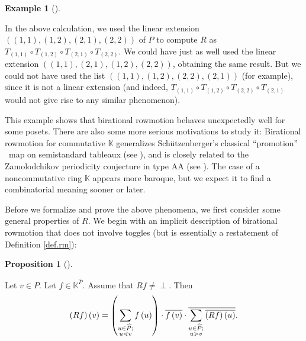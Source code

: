 \documentclass[numbers=enddot,12pt,final,onecolumn,notitlepage]{scrartcl}%
\theoremstyle{definition}
\newtheorem{prop}[theo]{Proposition}
\newenvironment{proposition}[1][]
{\begin{prop}[#1]\begin{leftbar}}
{\end{leftbar}\end{prop}}
\newtheorem{exam}[theo]{Example}
\newenvironment{example}[1][]
{\begin{exam}[#1]\begin{leftbar}}
{\end{leftbar}\end{exam}}
\newcommand{\undf}{\operatorname*{\bot}}
\let\sumnonlimits\sum
\renewcommand{\sum}{\sumnonlimits\limits}
\begin{document}
\begin{example}
In the above calculation, we used the linear extension $\left(  \left(
1,1\right)  ,\left(  1,2\right)  ,\left(  2,1\right)  ,\left(  2,2\right)
\right)  $ of $P$ to compute $R$ as $T_{\left(  1,1\right)  }\circ T_{\left(
1,2\right)  }\circ T_{\left(  2,1\right)  }\circ T_{\left(  2,2\right)  }$. We
could have just as well used the linear extension $\left(  \left(  1,1\right)
,\left(  2,1\right)  ,\left(  1,2\right)  ,\left(  2,2\right)  \right)  $,
obtaining the same result. But we could not have used the list $\left(
\left(  1,1\right)  ,\left(  1,2\right)  ,\left(  2,2\right)  ,\left(
2,1\right)  \right)  $ (for example), since it is not a linear extension (and
indeed, $T_{\left(  1,1\right)  }\circ T_{\left(  1,2\right)  }\circ
T_{\left(  2,2\right)  }\circ T_{\left(  2,1\right)  }$ would not give rise to
any similar phenomenon).

\end{example}

This example shows that birational rowmotion behaves unexpectedly well for
some posets. There are also some more serious motivations to study it:
Birational rowmotion for commutative $\mathbb{K}$ generalizes
Sch\"{u}tzenberger's classical \textquotedblleft promotion\textquotedblright%
\ map on semistandard tableaux (see \cite[Remark 11.6]{bir-row-arxiv}), and is
closely related to the Zamolodchikov periodicity conjecture in type AA (see
\cite[\S 4.4]{Roby15}). The case of a noncommutative ring $\mathbb{K}$ appears
more baroque, but we expect it to find a combinatorial meaning sooner or later.

Before we formalize and prove the above phenomena, we first consider some
general properties of $R$. We begin with an implicit description of birational
rowmotion that does not involve toggles (but is essentially a restatement of
Definition \ref{def.rm}):

\begin{proposition}
\label{prop.R.implicit}Let $v\in P$. Let $f\in\mathbb{K}^{\widehat{P}}$.
Assume that $Rf\neq\undf$. Then%
\begin{align*}
\left(  Rf\right)  \left(  v\right)  =\left(  \sum\limits_{\substack{u\in
\widehat{P};\\u\lessdot v}}f\left(  u\right)  \right)  \cdot\overline{f\left(
v\right)  }\cdot\overline{\sum\limits_{\substack{u\in\widehat{P};\\u\gtrdot
v}}\overline{\left(  Rf\right)  \left(  u\right)  }}.
\end{align*}

\end{proposition}
\end{document}
